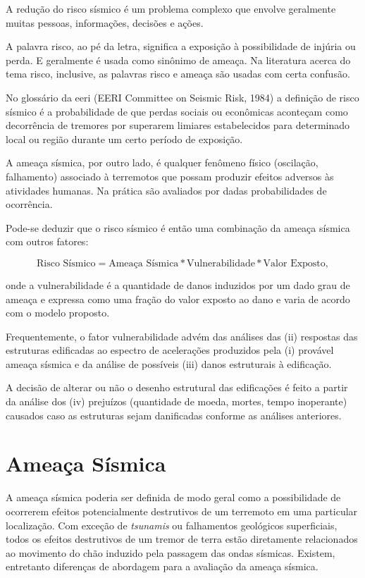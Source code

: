 A redução do risco sísmico é um problema complexo que envolve geralmente muitas pessoas, informações, decisões e ações.

A palavra risco, ao pé da letra, significa a exposição à possibilidade de injúria ou perda. E geralmente é usada como
sinônimo de ameaça. Na literatura acerca do tema risco, inclusive, as palavras risco e ameaça são usadas com certa
confusão.

No glossário da \gls{eeri} (EERI Committee on Seismic Risk, 1984) a definição de risco sísmico é a probabilidade de
que perdas sociais ou econômicas aconteçam como decorrência de tremores por superarem limiares estabelecidos para
determinado local ou região durante um certo período de exposição.

A ameaça sísmica, por outro lado, é qualquer fenômeno físico (oscilação, falhamento) associado à terremotos que possam
produzir efeitos adversos às atividades humanas. Na prática são avaliados por dadas probabilidades de ocorrência.

Pode-se deduzir que o risco sísmico é então uma combinação da ameaça sísmica com outros fatores:

\begin{equation}
		\text{Risco Sísmico} = \text{Ameaça Sísmica} \ast \text{Vulnerabilidade} \ast \text{Valor Exposto},
	\label{eq:risk}
\end{equation}

onde a vulnerabilidade é a quantidade de danos induzidos por um dado grau de ameaça e expressa como uma fração do
valor exposto ao dano e varia de acordo com o modelo proposto.

Frequentemente, o fator vulnerabilidade advém das análises das (ii) respostas das estruturas edificadas ao espectro de
acelerações produzidos pela (i) provável ameaça sísmica e da análise de possíveis (iii) danos estruturais à edificação.

A decisão de alterar ou não o desenho estrutural das edificações é feito a partir da análise dos (iv) prejuízos
(quantidade de moeda, mortes, tempo inoperante) causados caso as estruturas sejam danificadas conforme as análises anteriores.


\section{Ameaça Sísmica}
\label{sec:ameaca_sismica}

A ameaça sísmica poderia ser definida de modo geral como a possibilidade de ocorrerem efeitos potencialmente destrutivos
de um terremoto em uma particular localização. Com exceção de \textit{tsunamis} ou falhamentos geológicos superficiais,
todos os efeitos destrutivos de um tremor de terra estão diretamente relacionados ao movimento do chão induzido pela
passagem das ondas sísmicas. Existem, entretanto diferenças de abordagem para a avaliação da ameaça sísmica.

